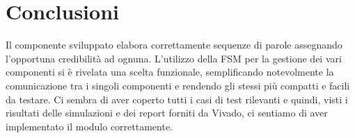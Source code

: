 \section{Conclusioni}
Il componente sviluppato elabora correttamente sequenze di parole assegnando l'opportuna credibilità ad ognuna.\newline
L'utilizzo della FSM per la gestione dei vari componenti si è rivelata una scelta funzionale, semplificando notevolmente la comunicazione tra i singoli componenti e rendendo gli stessi più compatti e facili da testare.
\newline
Ci sembra di aver coperto tutti i casi di test rilevanti e quindi, visti i risultati delle simulazioni e dei report forniti da Vivado, ci sentiamo di aver implementato il modulo correttamente.